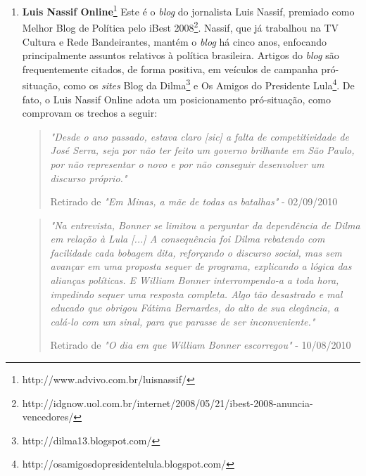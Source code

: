\begin{enumerate}

\item \textbf{Luis Nassif Online}\footnote{http://www.advivo.com.br/luisnassif/} Este é o \emph{blog} do jornalista Luis Nassif, premiado como Melhor Blog de Política pelo iBest 2008\footnote{http://idgnow.uol.com.br/internet/2008/05/21/ibest-2008-anuncia-vencedores/}. Nassif, que já trabalhou na TV Cultura e Rede Bandeirantes, mantém o \emph{blog} há cinco anos, enfocando principalmente assuntos relativos à política brasileira. Artigos do \emph{blog} são frequentemente citados, de forma positiva, em veículos de campanha pró-situação, como os \emph{sites} Blog da Dilma\footnote{http://dilma13.blogspot.com/} e Os Amigos do Presidente Lula\footnote{http://osamigosdopresidentelula.blogspot.com/}. De fato, o Luis Nassif Online adota um posicionamento pró-situação, como comprovam os trechos a seguir:

\begin{quote}
\emph{"Desde o ano passado, estava claro [sic] a falta de competitividade de José Serra, seja por não ter feito um governo brilhante em São Paulo, por não representar o novo e por não conseguir desenvolver um discurso próprio."}

{\small Retirado de \emph{"Em Minas, a mãe de todas as batalhas"} - 02/09/2010} 
\end{quote}

\begin{quote}

\emph{"Na entrevista, Bonner se limitou a perguntar da dependência de Dilma em relação à Lula [...] A consequência foi Dilma rebatendo com facilidade cada bobagem dita, reforçando o discurso social, mas sem avançar em uma proposta sequer de programa, explicando a lógica das alianças políticas. E William Bonner interrompendo-a a toda hora, impedindo sequer uma resposta completa. Algo tão desastrado e mal educado que obrigou Fátima Bernardes, do alto de sua elegância, a calá-lo com um sinal, para que parasse de ser inconveniente."}

{ \small Retirado de \emph{"O dia em que William Bonner escorregou"} - 10/08/2010}

\end{quote}



\end{enumerate}
